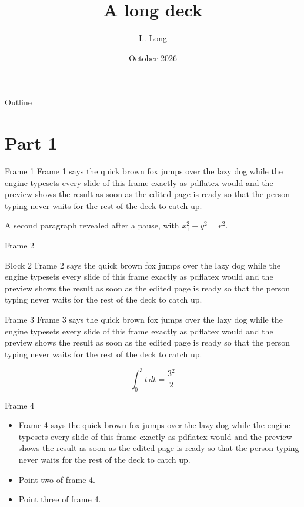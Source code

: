 \documentclass{beamer}
\title{A long deck}
\author{L. Long}
\date{October 2026}
\begin{document}
\begin{frame}\titlepage\end{frame}
\begin{frame}{Outline}\tableofcontents\end{frame}
\section{Part 1}
\begin{frame}{Frame 1}
  Frame 1 says the quick brown fox jumps over the lazy dog while the engine typesets every slide of this frame exactly as pdflatex would and the preview shows the result as soon as the edited page is ready so that the person typing never waits for the rest of the deck to catch up.
  \pause

  A second paragraph revealed after a pause, with $x_{1}^2 + y^2 = r^2$.
\end{frame}
\begin{frame}{Frame 2}
  \begin{block}{Block 2}
    Frame 2 says the quick brown fox jumps over the lazy dog while the engine typesets every slide of this frame exactly as pdflatex would and the preview shows the result as soon as the edited page is ready so that the person typing never waits for the rest of the deck to catch up.
  \end{block}
\end{frame}
\begin{frame}{Frame 3}
  Frame 3 says the quick brown fox jumps over the lazy dog while the engine typesets every slide of this frame exactly as pdflatex would and the preview shows the result as soon as the edited page is ready so that the person typing never waits for the rest of the deck to catch up.

  \[ \int_0^{3} t\,dt = \frac{3^2}{2} \]
\end{frame}
\begin{frame}{Frame 4}
  \begin{itemize}
    \item<1-> Frame 4 says the quick brown fox jumps over the lazy dog while the engine typesets every slide of this frame exactly as pdflatex would and the preview shows the result as soon as the edited page is ready so that the person typing never waits for the rest of the deck to catch up.
    \item<2-> Point two of frame 4.
    \item<3-> Point three of frame 4.
  \end{itemize}
\end{frame}
\end{document}
